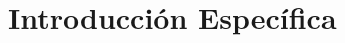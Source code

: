 \documentclass[aspectratio=43, handout]{beamer}
\begin{document}
\section{Introducción Específica}
%

\end{document}
